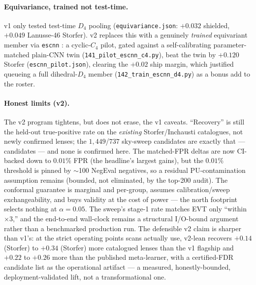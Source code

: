 \paragraph{Equivariance, trained not test-time.} v1 only tested test-time $D_4$
pooling (\texttt{equivariance.json}: $+0.032$ shielded, $+0.049$ Lanusse-46
Storfer). v2 replaces this with a genuinely \emph{trained} equivariant member
via \texttt{escnn} \citep{weiler2019escnn}: a cyclic-$C_4$ pilot, gated against a
self-calibrating parameter-matched plain-CNN twin
(\texttt{141\_pilot\_escnn\_c4.py}), beat the twin by $+0.120$ Storfer (\texttt{escnn\_pilot.json}), clearing the $+0.02$ ship margin,
which justified queueing a full dihedral-$D_4$ member (\texttt{142\_train\_escnn\_d4.py})
as a bonus add to the roster.

\paragraph{Honest limits (v2).} The v2 program tightens, but does not erase, the v1
caveats. ``Recovery'' is still the held-out true-positive rate on the
\emph{existing} Storfer/Inchausti catalogues, not newly confirmed lenses; the
$1{,}449$/$737$ sky-sweep candidates are exactly that --- candidates --- and none is
confirmed here. The matched-FPR deltas are now CI-backed down to $0.01\%$ FPR
(the headline's largest gains), but the $0.01\%$ threshold is pinned by $\sim$100
NegEval negatives, so a residual PU-contamination assumption remains (bounded, not
eliminated, by the top-200 audit). The conformal guarantee is marginal and per-group,
assumes calibration/sweep exchangeability, and buys validity at the cost of power ---
the north footprint selects nothing at $\alpha{=}0.05$. The sweep's stage-1 rate
matches EVT only ``within $\times3$,'' and the end-to-end wall-clock remains a
structural I/O-bound argument rather than a benchmarked production run. The
defensible v2 claim is sharper than v1's: at the strict operating points scans
actually use, v2-lean recovers $+0.14$ (Storfer) to $+0.34$
(Storfer) more catalogued lenses than the v1 flagship and $+0.22$ to
$+0.26$ more than the published meta-learner, with a certified-FDR candidate list as
the operational artifact --- a measured, honestly-bounded, deployment-validated lift,
not a transformational one.
